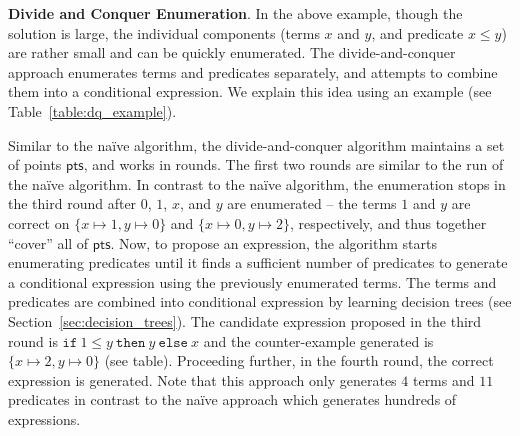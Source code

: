 \documentclass{llncs}
\newcommand\Points{\mathsf{pts}}
\newcommand\ITE[3]{\mathtt{if}~#1~\mathtt{then}~#2~\mathtt{else}~#3}
\renewcommand{\paragraph}[1]{\par\noindent\textbf{#1}.}
\begin{document}
\paragraph{Divide and Conquer Enumeration}
In the above example, though the solution is large, the
individual components (terms $x$ and $y$, and predicate $x \leq
y$) are rather small and can be quickly enumerated.
%
The divide-and-conquer approach enumerates terms and predicates
separately, and attempts to combine them into a conditional expression.
We explain this idea using an example (see Table~\ref{table:dq_example}).

Similar to the na\"ive algorithm, the divide-and-conquer algorithm
maintains a set of points $\Points$, and works in rounds.
The first two rounds are similar to the run of the na\"ive algorithm.
In contrast to the na\"ive algorithm, the enumeration stops in the third
round after $0$, $1$, $x$, and $y$ are enumerated -- the terms $1$ and
$y$ are correct on $\{ x \mapsto 1, y \mapsto 0 \}$ and $\{ x \mapsto 0,
y \mapsto 2 \}$, respectively, and thus together ``cover'' all of $\Points$.
Now, to propose an expression, the algorithm starts enumerating
predicates until it finds a sufficient number of predicates to generate
a conditional expression using the previously enumerated terms.
The terms and predicates are combined into conditional expression by
learning decision trees (see Section~\ref{sec:decision_trees}).
The candidate expression proposed in the third round is
$\ITE{1 \leq y}{y}{x}$ and the counter-example generated is
$\{ x \mapsto 2, y \mapsto 0 \}$ (see table).
Proceeding further, in the fourth round, the correct expression is
generated.
Note that this approach only generates $4$ terms and $11$ predicates in
contrast to the na\"ive approach which generates hundreds of
expressions.
\end{document}
